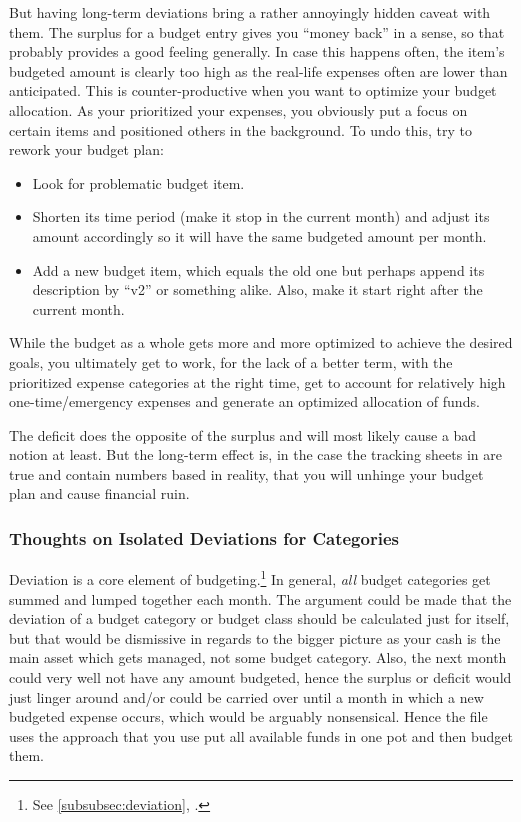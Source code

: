 But having long-term deviations bring a rather annoyingly hidden caveat with them.
The surplus for a budget entry gives you ``money back'' in a sense, so that probably provides a good feeling generally.
In case this happens often, the item's budgeted amount is clearly too high as the real-life expenses often are lower than anticipated.
This is counter-productive when you want to optimize your budget allocation.
As your prioritized your expenses, you obviously put a focus on certain items and positioned others in the background.
To undo this, try to rework your budget plan:
\begin{itemize}
	\item Look for problematic budget item.
	\item Shorten its time period (make it stop in the current month) and adjust its amount accordingly so it will have the same budgeted amount per month.
	\item Add a new budget item, which equals the old one but perhaps append its description by ``v2'' or something alike.
	Also, make it start right after the current month.
\end{itemize}
While the budget as a whole gets more and more optimized to achieve the desired goals, you ultimately get to work, for the lack of a better term, with the prioritized expense categories at the right time, get to account for relatively high one-time/emergency expenses and generate an optimized allocation of funds.

The deficit does the opposite of the surplus and will most likely cause a bad notion at least.
But the long-term effect is, in the case the tracking sheets in \tfn are true and contain numbers based in reality, that you will unhinge your budget plan and cause financial ruin.

\subsubsection{Thoughts on Isolated Deviations for Categories}
\label{subsubsec:thoughts-on-isolated-deviations-for-categories}

Deviation is a core element of budgeting.\footnote{See \autoref{subsubsec:deviation}, .}
In general, \emph{all} budget categories get summed and lumped together each month.
The argument could be made that the deviation of a budget category or budget class should be calculated just for itself, but that would be dismissive in regards to the bigger picture as your cash is the main asset which gets managed, not some budget category.
Also, the next month could very well not have any amount budgeted, hence the surplus or deficit would just linger around and/or could be carried over until a month in which a new budgeted expense occurs, which would be arguably nonsensical.
Hence the file uses the approach that you use put all available funds in one pot and then budget them.

